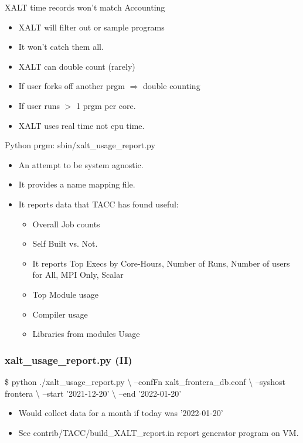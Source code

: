 \documentclass{beamer}
\begin{document}
\begin{frame}{XALT time records won't match Accounting}
  \begin{itemize}
    \item XALT will filter out or sample programs
    \item It won't catch them all.
    \item XALT can double count (rarely)
    \item If user forks off another prgm $\Rightarrow$ double counting
    \item If user runs $>$ 1 prgm per core.
    \item XALT uses real time not cpu time.
  \end{itemize}
\end{frame}

\begin{frame}{Python prgm: sbin/xalt\_usage\_report.py}
  \begin{itemize}
    \item An attempt to be system agnostic.
    \item It provides a name mapping file.
    \item It reports data that TACC has found useful:
      \begin{itemize}
        \item Overall Job counts
        \item Self Built vs. Not.
        \item It reports Top Execs by Core-Hours, Number of Runs,
          Number of users for All, MPI Only, Scalar
        \item Top Module usage
        \item Compiler usage
        \item Libraries from modules Usage
      \end{itemize}
  \end{itemize}
\end{frame}

\begin{frame}[fragile]
    \frametitle{xalt\_usage\_report.py (II)}
 {\small
    \begin{semiverbatim}
\$ python ./xalt_usage_report.py           \textbackslash
        --confFn xalt_frontera_db.conf    \textbackslash
        --syshost frontera                \textbackslash
        --start '2021-12-20'              \textbackslash
        --end   '2022-01-20'
    \end{semiverbatim}
}
  \begin{itemize}
    \item Would collect data for a month if today was '2022-01-20'
    \item See contrib/TACC/build\_XALT\_report.in report generator
      program on VM.
  \end{itemize}

\end{frame}
\end{document}
